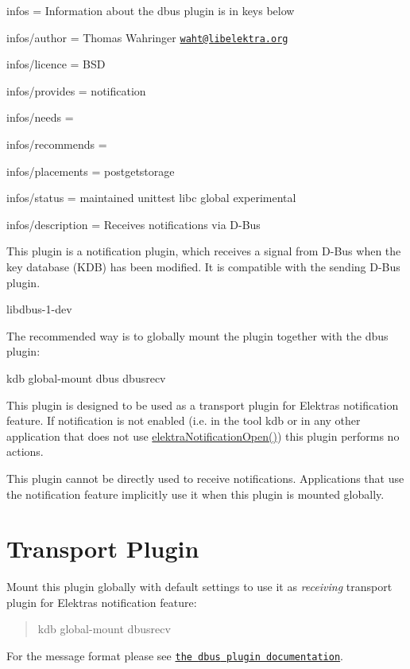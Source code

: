 
\begin{DoxyItemize}
\item infos = Information about the dbus plugin is in keys below
\item infos/author = Thomas Wahringer \href{mailto:waht@libelektra.org}{\tt waht@libelektra.\+org}
\item infos/licence = B\+SD
\item infos/provides = notification
\item infos/needs =
\item infos/recommends =
\item infos/placements = postgetstorage
\item infos/status = maintained unittest libc global experimental
\item infos/description = Receives notifications via D-\/\+Bus
\end{DoxyItemize}

This plugin is a notification plugin, which receives a signal from D-\/\+Bus when the key database (K\+DB) has been modified. It is compatible with the sending D-\/\+Bus plugin.


\begin{DoxyItemize}
\item {\ttfamily libdbus-\/1-\/dev}
\end{DoxyItemize}

The recommended way is to globally mount the plugin together with the dbus plugin\+:


\begin{DoxyCode}
kdb global-mount dbus dbusrecv
\end{DoxyCode}


This plugin is designed to be used as a transport plugin for Elektra\textquotesingle{}s notification feature. If notification is not enabled (i.\+e. in the tool {\ttfamily kdb} or in any other application that does not use {\ttfamily \hyperlink{group__kdbnotification_gaeae96154abdb5fdbf1b34a01e2b23e44}{elektra\+Notification\+Open()}}) this plugin performs no actions.

This plugin cannot be directly used to receive notifications. Applications that use the notification feature implicitly use it when this plugin is mounted globally.\hypertarget{autotoc_md163_autotoc_md166}{}\section{Transport Plugin}\label{autotoc_md163_autotoc_md166}
Mount this plugin globally with default settings to use it as {\itshape receiving} transport plugin for Elektra\textquotesingle{}s notification feature\+:

\begin{quote}
kdb global-\/mount dbusrecv \end{quote}


For the message format please see \href{https://www.libelektra.org/plugins/dbus#notification-format}{\tt the {\ttfamily dbus} plugin documentation}. 